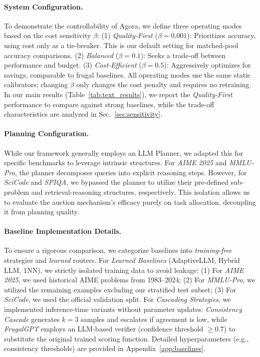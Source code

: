 \documentclass[11pt]{article}
\begin{document}
\paragraph{System Configuration.}
To demonstrate the controllability of Agora, we define three operating modes based on the cost sensitivity $\beta$:
(1) \emph{Quality-First} ($\beta=0.001$): Prioritizes accuracy, using cost only as a tie-breaker. This is our default setting for matched-pool accuracy comparisons.
(2) \emph{Balanced} ($\beta=0.1$): Seeks a trade-off between performance and budget.
(3) \emph{Cost-Efficient} ($\beta=0.5$): Aggressively optimizes for savings, comparable to frugal baselines.
All operating modes use the same static calibrators; changing $\beta$ only changes the cost penalty and requires no retraining.
In our main results (Table~\ref{tab:text_results}), we report the \emph{Quality-First} performance to compare against strong baselines, while the trade-off characteristics are analyzed in Sec.~\ref{sec:sensitivity}.

\paragraph{Planning Configuration.}
While our framework generally employs an LLM Planner, we adapted this for specific benchmarks to leverage intrinsic structures. For \textit{AIME 2025} and \textit{MMLU-Pro}, the planner decomposes queries into explicit reasoning steps. However, for \textit{SciCode} and \textit{SPIQA}, we bypassed the planner to utilize their pre-defined sub-problem and retrieval-reasoning structures, respectively. This isolation allows us to evaluate the auction mechanism's efficacy purely on task allocation, decoupling it from planning quality.


\paragraph{Baseline Implementation Details.}
To ensure a rigorous comparison, we categorize baselines into \textit{training-free} strategies and \textit{learned} routers. 
For \emph{Learned Baselines} (AdaptiveLLM, Hybrid LLM, 1NN), we strictly isolated training data to avoid leakage: 
(1) For \emph{AIME 2025}, we used historical AIME problems from 1983--2024; 
(2) For \emph{MMLU-Pro}, we utilized the remaining examples excluding our stratified test subset; 
(3) For \emph{SciCode}, we used the official validation split.
For \emph{Cascading Strategies}, we implemented inference-time variants without parameter updates: \textit{Consistency Cascade} generates $k=3$ samples and escalates if agreement is low, while \textit{FrugalGPT} employs an LLM-based verifier (confidence threshold $\ge 0.7$) to substitute the original trained scoring function.
Detailed hyperparameters (e.g., consistency thresholds) are provided in Appendix~\ref{app:baselines}.
\end{document}
